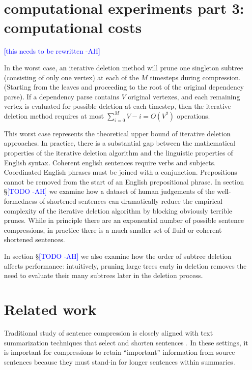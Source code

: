 \documentclass[11pt,a4paper]{article}
\newcommand{\ahcomment}[1]{\textcolor{blue}{[#1 -AH]}}
\begin{document}
\section{computational experiments part 3: computational costs}

\ahcomment{this needs to be rewritten}

In the worst case, an iterative deletion method will prune one singleton subtree (consisting of only one vertex) at each of the $M$ timesteps during compression. (Starting from the leaves and proceeding to the root of the original dependency parse). If a dependency parse contains $V$ original vertexes, and each remaining vertex is evaluated for possible deletion at each timestep, then the iterative deletion method requires at most ${\sum_{i = 0}^M V - i = O(V^2)}$ operations.

This worst case represents the theoretical upper bound of iterative deletion approaches. In practice, there is a substantial gap between the mathematical properties of the iterative deletion algorithm and the linguistic properties of English syntax. Coherent english sentences require verbs and subjects. Coordinated English phrases must be joined with a conjunction. Prepositions cannot be removed from the start of an English prepositional phrase. In section \S\ahcomment{TODO} we examine how a dataset of human judgements of the well-formedness of shortened sentences can dramatically reduce the empirical complexity of the iterative deletion algorithm by blocking obviously terrible prunes. While in principle there are an exponential number of possible sentence compressions, in practice there is a much smaller set of fluid or coherent shortened sentences. 

In section \S\ahcomment{TODO} we also examine how the order of subtree deletion affects performance: intuitively, pruning large trees early in deletion removes the need to evaluate their many subtrees later in the deletion process.



\section{Related work}

Traditional study of sentence compression is closely aligned with text summarization techniques that select and  shorten sentences \cite{Knight2000StatisticsBasedS,vanderwende2007beyond,clarke2008global,Nenkova2012ASO}. 
In these settings, it is important for compressions to retain ``important'' information from source sentences because they must stand-in for longer sentences within summaries.
\end{document}
